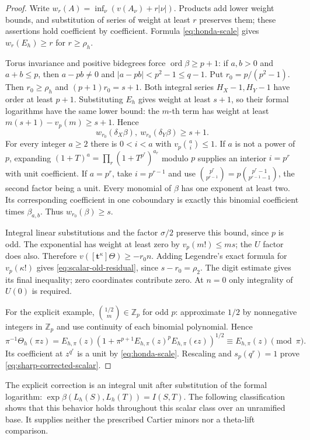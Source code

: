\documentclass[11pt,a4paper]{article}
\theoremstyle{definition}\newtheorem{remark}[theorem]{Remark}
\newcommand{\Z}{\mathbb Z}\newcommand{\Q}{\mathbb Q}\newcommand{\F}{\mathbb F}
\newcommand{\ord}{\operatorname{ord}}\newcommand{\gr}{\operatorname{gr}}
\begin{document}
\begin{proof}
Write $w_r(A)=\inf_\nu(v(A_\nu)+r|\nu|)$. Products add lower weight bounds, and substitution of series of weight at least $r$ preserves them; these assertions hold coefficient by coefficient. Formula \eqref{eq:honda-scale} gives $w_r(E_h)\ge r$ for $r\ge\rho_h$.

Torus invariance and positive bidegrees force $\ord\beta\ge p+1$: if $a,b>0$ and $a+b\le p$, then $a-pb\ne0$ and $|a-pb|<p^2-1\le q-1$. Put $r_0=p/(p^2-1)$. Then $r_0\ge\rho_h$ and $(p+1)r_0=s+1$. Both integral series $H_X-1,H_Y-1$ have order at least $p+1$. Substituting $E_h$ gives weight at least $s+1$, so their formal logarithms have the same lower bound: the $m$-th term has weight at least $m(s+1)-v_p(m)\ge s+1$. Hence
\[
 w_{r_0}(\delta_X\beta),\ w_{r_0}(\delta_Y\beta)\ge s+1.
\]
For every integer $a\ge2$ there is $0<i<a$ with $v_p\binom ai\le1$. If $a$ is not a power of $p$, expanding $(1+T)^a=\prod_r(1+T^{p^r})^{a_r}$ modulo $p$ supplies an interior $i=p^r$ with unit coefficient. If $a=p^r$, take $i=p^{r-1}$ and use $\binom{p^r}{p^{r-1}}=p\binom{p^r-1}{p^{r-1}-1}$, the second factor being a unit. Every monomial of $\beta$ has one exponent at least two. Its corresponding coefficient in one coboundary is exactly this binomial coefficient times $\beta_{a,b}$. Thus $w_{r_0}(\beta)\ge s$.

Integral linear substitutions and the factor $\sigma/2$ preserve this bound, since $p$ is odd. The exponential has weight at least zero by $v_p(m!)\le ms$; the $U$ factor does also. Therefore $v([\mathbf t^\kappa]\Theta)\ge-r_0n$. Adding Legendre's exact formula for $v_p(\kappa!)$ gives \eqref{eq:scalar-old-residual}, since $s-r_0=\rho_2$. The digit estimate gives its final inequality; zero coordinates contribute zero. At $n=0$ only integrality of $U(0)$ is required.

For the explicit example, $\binom{1/2}{m}\in\Z_p$ for odd $p$: approximate $1/2$ by nonnegative integers in $\Z_p$ and use continuity of each binomial polynomial. Hence
\[
 \pi^{-1}\Theta_h(\pi z)
 =E_{h,\pi}(z)\left(1+\pi^{p+1}E_{h,\pi}(z)^pE_{h,\pi}(\epsilon z)\right)^{1/2}
 \equiv E_{h,\pi}(z)\pmod\pi.
\]
Its coefficient at $z^{q^r}$ is a unit by \eqref{eq:honda-scale}. Rescaling and $s_p(q^r)=1$ prove \eqref{eq:sharp-corrected-scalar}.
\end{proof}

The explicit correction is an integral unit after substitution of the formal logarithm: $\exp\beta(L_h(S),L_h(T))=I(S,T)$. The following classification shows that this behavior holds throughout this scalar class over an unramified base. It supplies neither the prescribed Cartier minors nor a theta-lift comparison.
\end{document}

